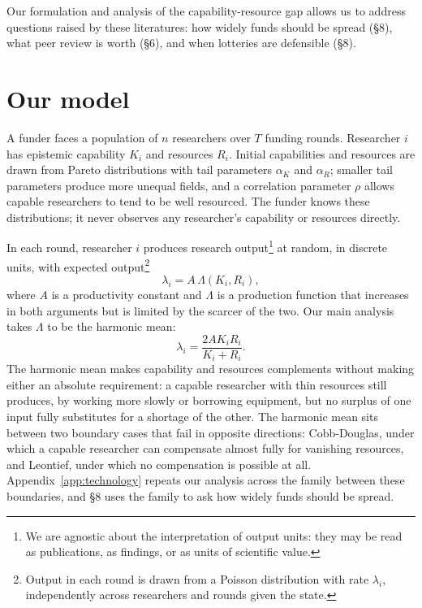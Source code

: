 \documentclass[article, 11pt, reqno]{amsart}
\theoremstyle{named}
\begin{document}
Our formulation and analysis of the capability-resource gap allows us to address questions
raised by these literatures: how widely funds should be spread (\S8), what peer review is
worth (\S6), and when lotteries are defensible (\S8).

\section{Our model}\label{sec:model}

A funder faces a population of $n$ researchers over $T$ funding rounds. Researcher $i$ has
epistemic capability $K_i$ and resources $R_i$. Initial capabilities and resources are
drawn from Pareto distributions with tail parameters $\alpha_K$ and $\alpha_R$; smaller
tail parameters produce more unequal fields, and a correlation parameter $\rho$ allows
capable researchers to tend to be well resourced. The funder knows these distributions; it
never observes any researcher's capability or resources directly.

In each round, researcher $i$ produces research output\footnote{We are agnostic about the
interpretation of output units: they may be read as publications, as findings, or as units
of scientific value.} at random, in discrete units, with expected output\footnote{Output in
each round is drawn from a Poisson distribution with rate $\lambda_i$, independently across
researchers and rounds given the state.}
\[
\lambda_i = A\,\Lambda(K_i, R_i),
\]
where $A$ is a productivity constant and $\Lambda$ is a production function that increases
in both arguments but is limited by the scarcer of the two. Our main analysis takes
$\Lambda$ to be the harmonic mean:
\[
\lambda_i = \frac{2A K_i R_i}{K_i + R_i}.
\]
The harmonic mean makes capability and resources complements without making either an
absolute requirement: a capable researcher with thin resources still produces, by working
more slowly or borrowing equipment, but no surplus of one input fully substitutes for a
shortage of the other. The harmonic mean sits between two boundary cases that fail in
opposite directions: Cobb-Douglas, under which a capable researcher can compensate almost
fully for vanishing resources, and Leontief, under which no compensation is possible at
all. Appendix~\ref{app:technology} repeats our analysis across the family between these
boundaries, and \S8 uses the family to ask how widely funds should be spread.
\end{document}

